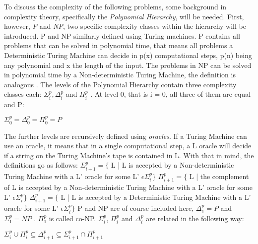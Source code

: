 \documentclass[12pt,a4paper]{article}
\begin{document}
To discuss the complexity of the following problems, some background in complexity theory, specifically the \textit{Polynomial Hierarchy}, will be needed. First, however, \textit{P} and \textit{NP}, two specific complexity classes within the hierarchy will be introduced.
\newline
P and NP similarly defined using Turing machines. P contains all problems that can be solved in polynomial time, that means all problems a Deterministic Turing Machine can decide in p(x) computational steps, p(n) being any polynomial and x the length of the input. The problems in NP can be solved in polynomial time by a Non-deterministic Turing Machine, the definition is analogous \citep{Davis1983}.
\newline
The levels of the Polynomial Hierarchy contain three complexity classes each: $\Sigma^p_i, \Delta^p_i$ and $\Pi^p_i$ \citep{Meyer1972}. At level 0, that is i = 0, all three of them are equal and P: 
\begin{center}
	$\Sigma^p_0 = \Delta^p_0 = \Pi^p_0 = P $ \citep{Stockmeyer1976}
\end{center}  
The further levels are recursively defined using \textit{oracles}. If a Turing Machine can use an oracle, it means that in a single computational step, a L oracle will decide if a string on the Turing Machine's tape is contained in L. With that in mind, the definitions go as follows:
\newline
\newline
	$\Sigma^p_{i+1} = \{$ L | L is accepted by a Non-deterministic Turing Machine with a L' oracle for some L' $\epsilon \Sigma^p_i\}$
\newline
\newline
	$\Pi^p_{i+1} = \{$ L | the complement of L is accepted by a Non-deterministic Turing Machine with a L' oracle for some L' $\epsilon \Sigma^p_i\}$
\newline
\newline
	$\Delta^p_{i+1} = \{$ L | L is accepted by a Deterministic Turing Machine with a L' oracle for some L' $\epsilon \Sigma^p_i\}$
\newline 
\newline
P and NP are of course included here, $\Delta^p_1 = P$ and $\Sigma^p_1 = NP$ \citep{Meyer1972}. $\Pi^p_1 $ is called co-NP.
\newline
$\Sigma^p_i$, $\Pi^p_i$ and $\Delta^p_i$ are related in the following way:
\begin{center}
	$\Sigma^p_i \cup \Pi^p_i \subseteq \Delta^p_{i+1} \subseteq \Sigma^p_{i+1} \cap \Pi^p_{i+1}$
\end{center}
\end{document}
